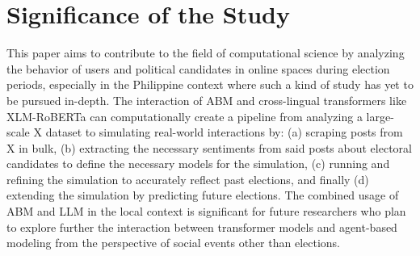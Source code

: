 \section{Significance of the Study}
This paper aims to contribute to the field of computational science by analyzing the behavior of users and political candidates in online spaces during election periods, especially in the Philippine context where such a kind of study has yet to be pursued in-depth. The interaction of ABM and cross-lingual transformers like XLM-RoBERTa can computationally create a pipeline from analyzing a large-scale X dataset to simulating real-world interactions by: (a) scraping posts from X in bulk, (b) extracting the necessary sentiments from said posts about electoral candidates to define the necessary models for the simulation, (c) running and refining the simulation to accurately reflect past elections, and finally (d) extending the simulation by predicting future elections. The combined usage of ABM and LLM in the local context is significant for future researchers who plan to explore further the interaction between transformer models and agent-based modeling from the perspective of social events other than elections.